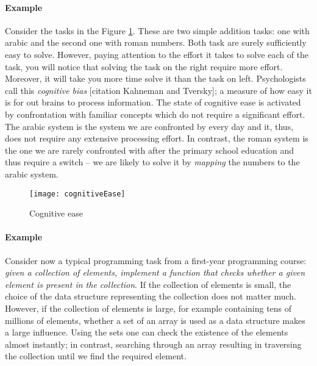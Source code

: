 \paragraph{Example} Consider the tasks in the Figure \ref{fig:cogease}.
These are two simple addition tasks: one with arabic and the second one with roman numbers.
Both task are surely sufficiently easy to solve. 
However, paying attention to the effort it takes to solve each of the task, you will notice that solving the task on the right require more effort.
Moreover, it will take you more time solve it than the task on left.
Psychologists call this \textit{cognitive bias} [citation Kahneman and Tversky]; a measure of how easy it is for out brains to process information.
The state of cognitive ease is activated by confrontation with familiar concepts which do not require a significant effort.
The arabic system is the system we are confronted by every day and it, thus, does not require any extensive processing effort.
In contrast, the roman system is the one we are rarely confronted with after the primary school education and thus require a switch -- we are likely to solve it by \textit{mapping} the numbers to the arabic system.


 


\begin{figure}
	\centering
	\texttt{[image: cognitiveEase]}
	\caption{Cognitive ease}
	\label{fig:cogease}
\end{figure}



\paragraph{Example} Consider now a typical programming task from a first-year programming course: \textit{given a collection of elements, implement a function that checks whether a given element is present in the collection}.
If the collection of elements is small, the choice of the data structure representing the collection does not matter much.
However, if the collection of elements is large, for example containing tens of millions of elements, whether a set of an array is used as a data structure makes a large influence.
Using the sets one can check the existence of the elements almost instantly; in contrast, searching through an array resulting in traversing the collection until we find the required element.



